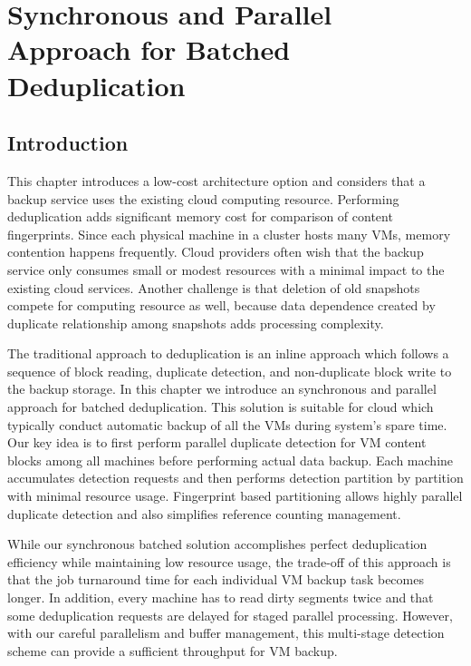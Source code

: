 \chapter{Synchronous and Parallel Approach for Batched Deduplication}
\label{chap:offline}
\section{Introduction}
\label{offline:intro}
This chapter introduces a low-cost architecture option and considers that
a backup service uses the existing cloud computing resource.
Performing deduplication adds significant  memory cost for comparison of content fingerprints. 
Since each physical machine in a cluster  hosts many VMs, memory contention happens frequently. 
Cloud providers often wish that the backup service only consumes  small or modest resources 
with a minimal impact to the existing cloud services.  Another challenge is 
that deletion of old snapshots compete for computing resource as well, because data dependence created 
by duplicate relationship among snapshots  adds processing complexity.

The traditional approach to deduplication is an inline approach which follows
a sequence of block reading, duplicate detection,  and non-duplicate  block write to the 
backup storage. In this chapter we introduce an synchronous and parallel approach
for batched deduplication. This solution is suitable for cloud which typically conduct
automatic backup of all the VMs during system's spare time.
Our key idea  is to  first perform parallel duplicate detection for VM content blocks 
among all machines before performing actual data backup. Each machine
accumulates detection requests and  then performs detection   partition by partition 
with minimal resource usage.
Fingerprint based partitioning allows highly parallel duplicate detection  and also simplifies 
reference counting management.  

While our synchronous batched solution accomplishes perfect deduplication efficiency while maintaining
low resource usage,
the trade-off of this approach is that the job turnaround time for each individual
VM backup task becomes longer. In addition,
every machine has to read dirty segments twice
and that some deduplication requests are delayed for staged parallel processing.
However, with our careful parallelism and buffer management,
this multi-stage detection scheme can provide a sufficient throughput for VM backup.

